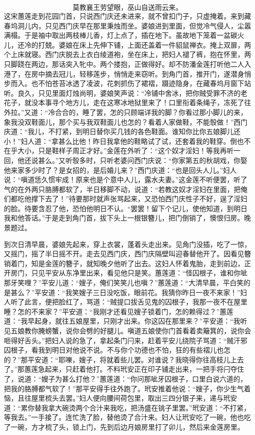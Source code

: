 \[
莫教襄王劳望眼，巫山自送雨云来。
\]
这宋蕙莲走到花园门首，只说西门庆还未进来，就不曾扣门子，只虚掩着。来到藏春坞洞儿内，只见西门庆早在那里秉烛而坐。婆娘进到里面，但觉冷气侵人，尘嚣满榻。于是袖中取出两枝棒儿香，灯上点了，插在地下。虽故地下笼着一盆碳火儿，还冷的打兢。婆娘在床上先伸下铺，上面还盖着一件貂鼠禅衣。掩上双扉，两个上床就寝。西门庆脱去上衣白绫道袍，坐在床上，把妇人褪了裤，抱在怀里，两只脚跷在两边，那话突入牝中。两个搂抱，正做得好。却不防潘金莲打听他二人入港了，在房中摘去冠儿，轻移莲步，悄悄走来窃听。到角门首，推开门，遂潜身悄步而入。也不怕苍苔冰透了凌波，花刺抓伤了裙褶，蹑迹隐身，在藏春坞月窗下站听。良久，只见里面灯烛尚明，婆娘笑声说：“冷铺中舍冰，把你贼受罪不济的老花子，就没本事寻个地方儿，走在这寒冰地狱里来了！口里衔着条绳子，冻死了往外拉。”又道：“冷合合的，睡了罢，怎的只顾端详我的脚？你看过那小脚儿的来，象我没双鞋面儿，那个买与我双鞋面儿也怎的？看着人家做鞋，不能彀做！”西门庆道：“我儿，不打紧，到明日替你买几钱的各色鞋面。谁知你比你五娘脚儿还小！”妇人道：“拿甚么比他！昨日我拿他的鞋略试了试，还套着我的鞋穿。倒也不在乎大小，只是鞋样子周正才好。”金莲在外听了：“这个奴才淫妇！等我再听一回，他还说甚么。”又听彀多时，只听老婆问西门庆说：“你家第五的秋胡戏，你娶他来家多少时了？是女招的，是后婚儿来？”西门庆道：“也是回头人儿。”妇人说：“嗔道恁久惯牢成！原来也是个意中人儿，露水夫妻。”这金莲不听便罢，听了气的在外两只胳膊都软了，半日移脚不动，说道：“若教这奴才淫妇在里面，把俺们都吃他撑下去了！”待要那时就声张骂起来，又恐怕西门庆性子不好，逞了淫妇的脸。待要含忍了他，恐怕他明日不认。“罢罢！留下个记儿，使他知道，到明日我和他答话。”于是走到角门首，拔下头上一根银簪儿，把门倒销了，懊恨归房。晚景题过。

到次日清早晨，婆娘先起来，穿上衣裳，蓬着头走出来。见角门没插，吃了一惊，又摇门，摇了半日摇不开。走去见西门庆，西门庆隔壁叫迎春替他开了。因看见簪销着门，知是金莲的簪子，就知晚夕他听了出去。这妇人怀着鬼胎，走到前边，正开房门，只见平安从东净里出来，看见他只是笑。蕙莲道：“怪囚根子，谁和你呲那牙笑哩？”平安儿道：“嫂子，俺们笑笑儿也嗔？”蕙莲道：“大清早晨，平白笑的是甚么？”平安道：“我笑嫂子三日没吃饭，眼前花。我猜你昨日一夜不来家！”妇人听了此言，便把脸红了，骂道：“贼提口拔舌见鬼的囚根子，我那一夜不在屋里睡？怎的不来家？”平安道：“我刚才还看见嫂子锁着门，怎的赖得过？”蕙莲道：“我早起身，就往五娘屋里，只刚才出来。你这囚在那里来？”平安道：“我听见五娘教你腌螃蟹，说你会劈的好腿儿。嗔道五娘使你门首看着卖簸箕的，说你会咂得好舌头。”把妇人说的急了，拿起条门闩来，赶着平安儿绕院子骂道：“贼汗邪囚根子，看我到明日对他说不说。不与你个功德也不怕，狂的有些褶儿也怎的？”那平安道：“耶嚛，嫂子，将就着些儿罢。对谁说？我晓得你往高枝儿上去了。”那蕙莲急起来，只赶着他打。不料玳安正在印子铺走出来，一把手将闩夺住了，说道：“嫂子为甚么打他？”蕙莲道：“你问那呲牙囚根子，口里白说六道的，把我的胳膊都气软了！”那平安得手往外跑了。玳安推着他说：“嫂子，你少生气着恼，且往屋里梳头去罢。”妇人便向腰间荷包里，取出三四分银子来，递与玳安道：“累你替我拿大碗烫两个合汁来我吃，把汤盛在铫子里罢。”玳安道：“不打紧，等我去。”一手接了。连忙洗了脸，替他烫了合汁来。妇人让玳安吃了一碗，他也吃了一碗，方才梳了头，锁上门，先到后边月娘房里打了卯儿，然后来金莲房里。

